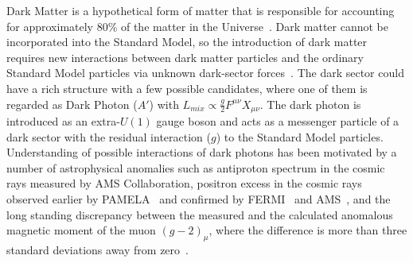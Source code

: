 \documentclass[../report.tex]{subfiles}
\begin{document}
Dark Matter is a hypothetical form of matter that is responsible for accounting for approximately 80\% of the matter in the Universe~\cite{Planck:2013jfk}.
Dark matter cannot be incorporated into the Standard Model, so the introduction of dark matter requires new interactions between dark matter particles 
and the ordinary Standard Model particles via unknown dark-sector forces~\cite{Alexander:2016aln}. 
The dark sector could have a rich structure with a few possible candidates, 
where one of them is regarded as Dark Photon ($A'$) with 
$L_{mix} \propto\frac{g}{2}F^{\mu\nu}X_{\mu\nu}$.
The dark photon is introduced as an extra-$U(1)$ gauge boson and acts as a messenger particle of a dark sector 
with the residual interaction ($g$) to the Standard Model particles.
Understanding of possible interactions of dark photons has been motivated by 
a number of astrophysical anomalies such as antiproton spectrum in 
the cosmic rays measured by AMS Collaboration,
positron excess in the cosmic rays observed earlier by PAMELA~\cite{Adriani:2008zr}
and confirmed by FERMI~\cite{FermiLAT:2011ab} and AMS~\cite{Aguilar:2013qda}, 
and the long standing discrepancy
between the measured and the calculated anomalous magnetic moment of 
the muon $(g-2)_{\mu}$, where
the difference is more than three standard deviations away from zero~\cite{Bennett:2006fi}.


\end{document}
